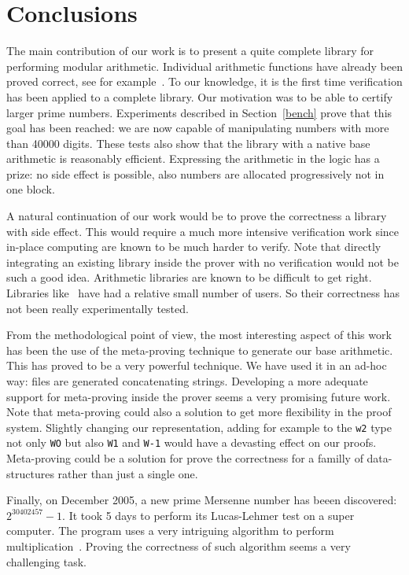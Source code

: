 \section{Conclusions}

The main contribution of our work is to present a quite complete library for performing
modular arithmetic. Individual arithmetic functions have already been proved correct,
see for example~\cite{BerMagZim02}. To our knowledge, it is the first time verification
has been applied to a complete library.
Our motivation was to be able to certify 
larger prime numbers. Experiments described in Section~\ref{bench}  prove that
this goal has been reached: we are now capable of manipulating numbers with more than 40000 digits.
These tests also show that the library with a native base arithmetic is
reasonably efficient. Expressing the arithmetic in the logic has a prize: no side effect is possible, 
also numbers are allocated progressively not in one block.

A natural continuation of our work would be to prove the correctness a library with side effect.
This would require a much more intensive verification work since in-place computing
are known to be much harder to verify.
Note that directly integrating an existing library inside the prover with no verification
would not be such a good idea.
Arithmetic libraries are known to be difficult to get right. Libraries like~\cite{bignum}
have had a relative small number of users. So their correctness has not
been really experimentally tested.

From the methodological point of view, the most interesting aspect of this work
has been the use of the meta-proving technique to generate our base arithmetic. This has proved
to be a very powerful technique. We have used it in an ad-hoc way: files are generated concatenating
strings. Developing a more adequate support for meta-proving inside the prover seems a
very promising future work. Note that meta-proving could also a solution to get more flexibility
in the proof system. Slightly changing our representation, adding for example to  the {\tt w2} type not only {\tt WO}
but also {\tt W1} and {\tt W-1} would have a devasting effect on our proofs.
Meta-proving could be a solution for prove the correctness for a familly of data-structures rather than
just a single one.

Finally, on December 2005, a new prime Mersenne number has beeen discovered: $2 ^{30402457} - 1$.
It took 5 days to  perform its Lucas-Lehmer test on a super computer. The program
uses a very intriguing algorithm to perform multiplication~\cite{crandall}. Proving the correctness of
such algorithm seems a very challenging task. 